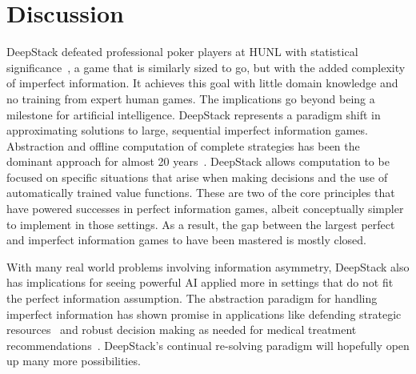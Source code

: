 \documentclass[12pt]{article}
\newcommand{\HUNL}{{HUNL}}
\begin{document}
\section*{Discussion}

DeepStack defeated professional poker players at \HUNL{} with statistical significance~\cite{Libratus}, a game that is similarly sized to go, but with the added complexity of imperfect information.
It achieves this goal with little domain knowledge and no training from expert human games.  The implications go beyond being a milestone for artificial intelligence.  DeepStack represents a paradigm shift in approximating solutions to large, sequential imperfect information games.  
Abstraction and offline computation of complete strategies has been the dominant approach for almost 20 years~\cite{Shi00:Rhode,BillingsEtAl03,Sandholm12}.  
DeepStack allows computation to be focused on specific situations that arise when making decisions and the use of automatically trained value functions.  These are two of the core principles that have powered successes in perfect information games, albeit conceptually simpler to implement in those settings.  As a result, the gap between the largest perfect and imperfect information games to have been mastered is mostly closed.

With many real world problems involving information asymmetry, DeepStack also has implications for seeing powerful AI applied more in settings that do not fit the perfect information assumption.  The abstraction paradigm for handling imperfect information has shown promise in applications like defending strategic resources~\cite{Lisy16:cfr-security} and robust decision making as needed for medical treatment recommendations~\cite{ChenBowling12}.  DeepStack's continual re-solving paradigm will hopefully open up many more possibilities.  




\nocite{ZinkevichLittman06}
\nocite{DustinGUISource}
\nocite{Tammelin15:CFR+}
\nocite{collobert2011torch7}
\nocite{Ganzfried14:EMD}
\end{document}
